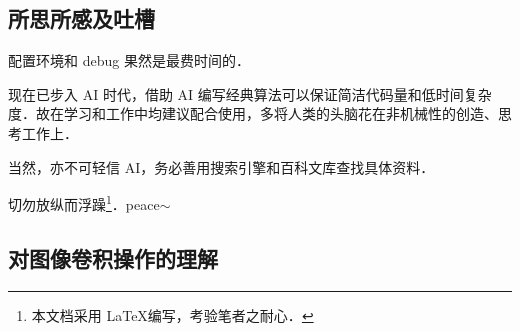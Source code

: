 \documentclass[12pt,a4paper,twoside]{ctexart}
\numberwithin{figure}{section}
\numberwithin{equation}{section}
\begin{document}
\subsection{所思所感及吐槽}
配置环境和 debug 果然是最费时间的．

现在已步入 AI 时代，借助 AI 编写经典算法可以保证简洁代码量和低时间复杂度．故在学习和工作中均建议配合使用，多将人类的头脑花在非机械性的创造、思考工作上．

当然，亦不可轻信 AI，务必善用搜索引擎和百科文库查找具体资料．

切勿放纵而浮躁\footnote{本文档采用 \LaTeX 编写，考验笔者之耐心．}．peace$\sim$



\subsection{对图像卷积操作的理解}
\end{document}
